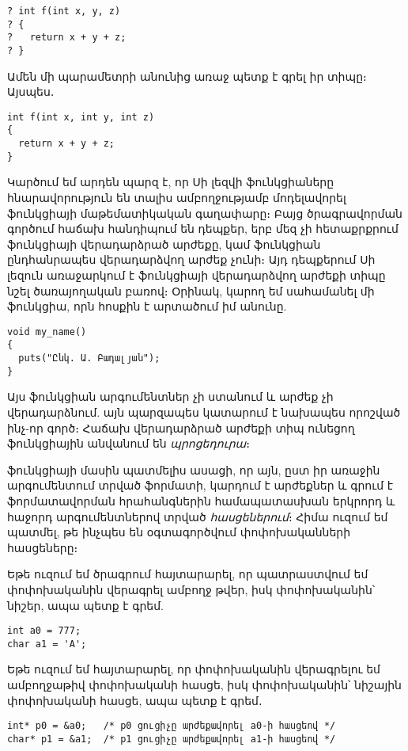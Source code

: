 \begin{Verbatim}
? int f(int x, y, z)
? {
?   return x + y + z;
? }
\end{Verbatim}

Ամեն մի պարամետրի անունից առաջ պետք է գրել իր տիպը։ Այսպես․

\begin{Verbatim}
int f(int x, int y, int z)
{
  return x + y + z;
}
\end{Verbatim}

Կարծում եմ արդեն պարզ է, որ Սի լեզվի ֆունկցիաները հնարավորություն են տալիս
ամբողջությամբ մոդելավորել ֆունկցիայի մաթեմատիկական գաղափարը։ Բայց ծրագրավորման
գործում հաճախ հանդիպում են դեպքեր, երբ մեզ չի հետաքրքրում ֆունկցիայի
վերադարձրած արժեքը, կամ ֆունկցիան ընդհանրապես վերադարձվող արժեք չունի։ Այդ
դեպքերում Սի լեզուն առաջարկում է ֆունկցիայի վերադարձվող արժեքի տիպը նշել
 ծառայողական բառով։ Օրինակ, կարող եմ սահամանել մի
ֆունկցիա, որն  հոսքին է արտածում իմ անունը.

\begin{Verbatim}
void my_name()
{
  puts("Ընկ. Ա. Բադալյան");
}
\end{Verbatim}

Այս ֆունկցիան արգումենտներ չի ստանում և արժեք չի վերադարձնում. այն
պարզապես կատարում է նախապես որոշված ինչ-որ գործ։ Հաճախ 
վերադարձրած արժեքի տիպ ունեցող ֆունկցիային անվանում են
\emph{պրոցեդուրա}։

 ֆունկցիայի մասին պատմելիս ասացի, որ այն,
ըստ իր առաջին արգումենտում տրված ֆորմատի, կարդում է արժեքներ և գրում
է ֆորմատավորման հրահանգներին համապատասխան երկրորդ և հաջորդ արգումենտներով
տրված \emph{հասցեներում}։ Հիմա ուզում եմ պատմել,
թե ինչպես են օգտագործվում փոփոխականների հասցեները։

Եթե ուզում եմ ծրագրում հայտարարել, որ պատրաստվում եմ  փոփոխականին
վերագրել ամբողջ թվեր, իսկ  փոփոխականին՝ նիշեր, ապա պետք է գրեմ.

\begin{Verbatim}
int a0 = 777;
char a1 = 'A';
\end{Verbatim}

Եթե ուզում եմ հայտարարել, որ  փոփոխականին վերագրելու եմ ամբողջաթիվ
փոփոխականի հասցե, իսկ  փոփոխականին՝ նիշային փոփոխականի հասցե,
ապա պետք է գրեմ․

\begin{Verbatim}
int* p0 = &a0;   /* p0 ցուցիչը արժեքավորել a0-ի հասցեով */
char* p1 = &a1;  /* p1 ցուցիչը արժեքավորել a1-ի հասցեով */
\end{Verbatim}

